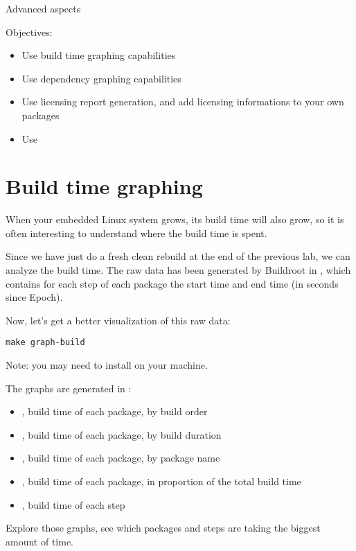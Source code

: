\subchapter
{Advanced aspects}
{Objectives:
  \begin{itemize}
  \item Use build time graphing capabilities
  \item Use dependency graphing capabilities
  \item Use licensing report generation, and add licensing
    informations to your own packages
  \item Use 
  \end{itemize}
}

\section{Build time graphing}

When your embedded Linux system grows, its build time will also grow,
so it is often interesting to understand where the build time is
spent.

Since we have just do a fresh clean rebuild at the end of the previous
lab, we can analyze the build time. The raw data has been generated by
Buildroot in , which contains for
each step of each package the start time and end time (in seconds
since Epoch).

Now, let's get a better visualization of this raw data:

\begin{verbatim}
make graph-build
\end{verbatim}

Note: you may need to install  on your machine.

The graphs are generated in :

\begin{itemize}
\item {}, build time of each package, by
  build order
\item {}, build time of each package, by
  build duration
\item {}, build time of each package, by
  package name
\item {}, build time of each package, in
  proportion of the total build time
\item {}, build time of each step
\end{itemize}

Explore those graphs, see which packages and steps are taking the
biggest amount of time.

